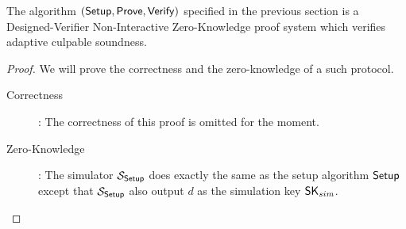 \begin{theorem}
  The algorithm $({\mathsf{Setup}}, {\mathsf{Prove}}, {\mathsf{Verify}})$ specified in the previous section is a Designed-Verifier Non-Interactive Zero-Knowledge proof system which verifies adaptive culpable soundness.
\end{theorem}

\begin{proof}
  We will prove the correctness and the zero-knowledge of a such protocol.
  \begin{description}
  \item[\textsf{Correctness}]: The correctness of this proof is omitted for the moment.
  \item[\textsf{Zero-Knowledge}]:
    The simulator $\mathcal{S}_{{\mathsf{Setup}}}$ does exactly the same as the setup algorithm ${\mathsf{Setup}}$ except that $\mathcal{S}_{{\mathsf{Setup}}}$ also output $d$ as the simulation key $\mathsf{SK}_{sim}$.


\end{description}
\end{proof}
